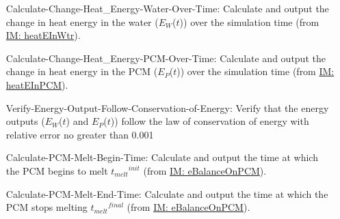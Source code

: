 \documentclass[12pt]{article}
\begin{document}
\begin{itemize}
\item[Calculate-Change-Heat\_Energy-Water-Over-Time:\phantomsection\label{calcChgHeatEnergyWtrOverTime}]Calculate and output the change in heat energy in the water (${E_{W}}$($t$)) over the simulation time (from \hyperref[IM:heatEInWtr]{IM: heatEInWtr}).
\item[Calculate-Change-Heat\_Energy-PCM-Over-Time:\phantomsection\label{calcChgHeatEnergyPCMOverTime}]Calculate and output the change in heat energy in the PCM (${E_{P}}$($t$)) over the simulation time (from \hyperref[IM:heatEInPCM]{IM: heatEInPCM}).
\item[Verify-Energy-Output-Follow-Conservation-of-Energy:\phantomsection\label{verifyEnergyOutput}]Verify that the energy outputs (${E_{W}}$($t$) and ${E_{P}}$($t$)) follow the law of conservation of energy with relative error no greater than 0.001%
\item[Calculate-PCM-Melt-Begin-Time:\phantomsection\label{calcPCMMeltBegin}]Calculate and output the time at which the PCM begins to melt ${{t_{melt}}^{init}}$ (from \hyperref[IM:eBalanceOnPCM]{IM: eBalanceOnPCM}).
\item[Calculate-PCM-Melt-End-Time:\phantomsection\label{calcPCMMeltEnd}]Calculate and output the time at which the PCM stops melting ${{t_{melt}}^{final}}$ (from \hyperref[IM:eBalanceOnPCM]{IM: eBalanceOnPCM}).
\end{itemize}
\end{document}
